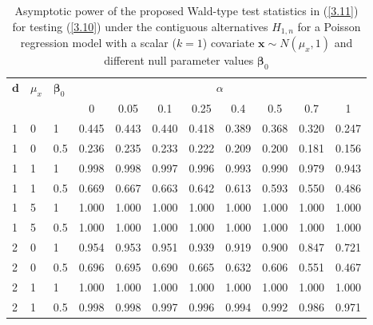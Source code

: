 \documentclass[a4paper]{article}%
\begin{document}
\begin{table}[h]
\caption{Asymptotic power of the proposed Wald-type test statistics in
(\ref{3.11}) for testing (\ref{3.10}) under the contiguous alternatives
$H_{1,n}$ for a Poisson regression model with a scalar ($k=1$) covariate
$\boldsymbol{x}\sim N(\mu_{x}, 1)$ and different null parameter values
$\boldsymbol{\beta}_{0}$}%
\label{TAB:ContPower}
\centering
%
\begin{tabular}
[c]{|l|l|l|cccccccc|}\hline
$\boldsymbol{d}$ & $\mu_{x}$ & $\boldsymbol{\beta}_{0}$ &
\multicolumn{8}{c|}{$\alpha$}\\
&  &  & 0 & 0.05 & 0.1 & 0.25 & 0.4 & 0.5 & 0.7 & 1\\\hline\hline
1 & 0 & 1 & 0.445 & 0.443 & 0.440 & 0.418 & 0.389 & 0.368 & 0.320 & 0.247\\
1 & 0 & 0.5 & 0.236 & 0.235 & 0.233 & 0.222 & 0.209 & 0.200 & 0.181 & 0.156\\
1 & 1 & 1 & 0.998 & 0.998 & 0.997 & 0.996 & 0.993 & 0.990 & 0.979 & 0.943\\
1 & 1 & 0.5 & 0.669 & 0.667 & 0.663 & 0.642 & 0.613 & 0.593 & 0.550 & 0.486\\
1 & 5 & 1 & 1.000 & 1.000 & 1.000 & 1.000 & 1.000 & 1.000 & 1.000 & 1.000\\
1 & 5 & 0.5 & 1.000 & 1.000 & 1.000 & 1.000 & 1.000 & 1.000 & 1.000 &
1.000\\\hline
2 & 0 & 1 & 0.954 & 0.953 & 0.951 & 0.939 & 0.919 & 0.900 & 0.847 & 0.721\\
2 & 0 & 0.5 & 0.696 & 0.695 & 0.690 & 0.665 & 0.632 & 0.606 & 0.551 & 0.467\\
2 & 1 & 1 & 1.000 & 1.000 & 1.000 & 1.000 & 1.000 & 1.000 & 1.000 & 1.000\\
2 & 1 & 0.5 & 0.998 & 0.998 & 0.997 & 0.996 & 0.994 & 0.992 & 0.986 &
0.971\\\hline
\end{tabular}
\end{table}
\end{document}
